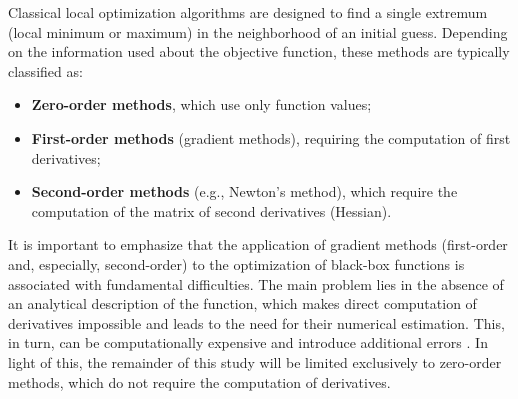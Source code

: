 \documentclass[runningheads]{llncs}
\begin{document}



Classical local optimization algorithms are designed to find a single extremum (local minimum or maximum) in the neighborhood of an initial guess. Depending on the information used about the objective function, these methods are typically classified as:
\begin{itemize}
	\item \textbf{Zero-order methods}, which use only function values;
	\item \textbf{First-order methods} (gradient methods), requiring the computation of first derivatives;
	\item \textbf{Second-order methods} (e.g., Newton's method), which require the computation of the matrix of second derivatives (Hessian).
\end{itemize}


It is important to emphasize that the application of gradient methods (first-order and, especially, second-order) to the optimization of black-box functions is associated with fundamental difficulties. The main problem lies in the absence of an analytical description of the function, which makes direct computation of derivatives impossible and leads to the need for their numerical estimation. This, in turn, can be computationally expensive and introduce additional errors \cite{Kelley}. In light of this, the remainder of this study will be limited exclusively to zero-order methods, which do not require the computation of derivatives.
\end{document}
